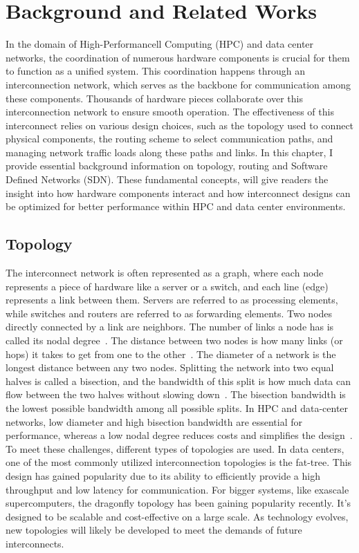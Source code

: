 \chapter{Background and Related Works} In the domain of High-Performancell
Computing (HPC) and data center networks, the coordination of numerous hardware
components is crucial for them to function as a unified system. This
coordination happens through an interconnection network, which serves as the
backbone for communication among these components. Thousands of hardware pieces
collaborate over this interconnection network to ensure smooth operation. The
effectiveness of this interconnect relies on various design choices, such as the
topology used to connect physical components, the routing scheme to select
communication paths, and managing network traffic loads along these paths and
links.  In this chapter, I provide essential background information on topology,
routing and Software Defined Networks (SDN). These fundamental concepts, will give readers the insight into how hardware components interact and how interconnect designs can be optimized for better performance within HPC and data center environments.

\section{Topology} The interconnect network is often represented as a graph, where each node represents a piece of hardware like a server or a switch,
and each line (edge) represents a link between them. Servers are referred to as processing elements, while switches and routers are referred to as forwarding elements. Two nodes directly connected by a link are neighbors. The
number of links a node has is called its nodal degree~\cite{dally2004principles}. The distance
between two nodes is how many links (or hops) it takes to get from one to
the other~\cite{dally2004principles}. The diameter of a network is the longest distance between any two
nodes.  Splitting the network into two equal halves is called a bisection, and
the bandwidth of this split is how much data can flow between the two halves
without slowing down~\cite{dally2004principles}. The bisection bandwidth is the lowest possible bandwidth
among all possible splits. In HPC and data-center networks, low diameter and high bisection bandwidth are essential for performance, whereas a low nodal degree reduces costs and simplifies the design~\cite{li2016low}. To meet these challenges,
different types of topologies are used. In data centers, one of the most
commonly utilized interconnection topologies is the fat-tree. This design has
gained popularity due to its ability to efficiently provide a high throughput
and low latency for communication. For bigger systems, like exascale
supercomputers, the dragonfly topology has been gaining popularity recently.
It's designed to be scalable and cost-effective on a large scale. As technology
evolves, new topologies will likely be developed to meet the demands of future
interconnects.

